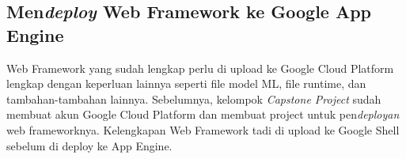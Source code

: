     \subsection{Men\textit{deploy} Web Framework ke Google App Engine}
    
    Web Framework yang sudah lengkap perlu di upload ke Google Cloud Platform lengkap dengan keperluan lainnya seperti file model ML, file runtime, dan tambahan-tambahan lainnya.
    Sebelumnya, kelompok \textit{Capstone Project} sudah membuat akun Google Cloud Platform dan membuat project untuk pen\textit{deployan} web frameworknya.
    Kelengkapan Web Framework tadi di upload ke Google Shell sebelum di deploy ke App Engine.